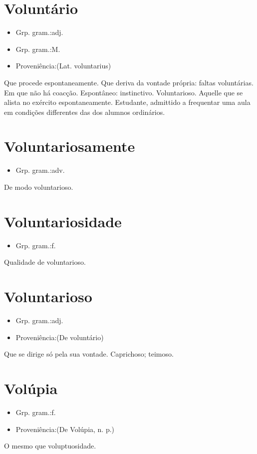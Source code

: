 \documentclass{article}
\begin{document}
\section{Voluntário}
\begin{itemize}
\item {Grp. gram.:adj.}
\end{itemize}
\begin{itemize}
\item {Grp. gram.:M.}
\end{itemize}
\begin{itemize}
\item {Proveniência:(Lat. \textunderscore voluntarius\textunderscore )}
\end{itemize}
Que procede espontaneamente.
Que deriva da vontade própria: \textunderscore faltas voluntárias\textunderscore .
Em que não há coacção.
Espontâneo: instinctivo.
Voluntarioso.
Aquelle que se alista no exército espontaneamente.
Estudante, admittido a frequentar uma aula em condições differentes das dos alumnos ordinários.
\section{Voluntariosamente}
\begin{itemize}
\item {Grp. gram.:adv.}
\end{itemize}
De modo voluntarioso.
\section{Voluntariosidade}
\begin{itemize}
\item {Grp. gram.:f.}
\end{itemize}
Qualidade de voluntarioso.
\section{Voluntarioso}
\begin{itemize}
\item {Grp. gram.:adj.}
\end{itemize}
\begin{itemize}
\item {Proveniência:(De \textunderscore voluntário\textunderscore )}
\end{itemize}
Que se dirige só pela sua vontade.
Caprichoso; teimoso.
\section{Volúpia}
\begin{itemize}
\item {Grp. gram.:f.}
\end{itemize}
\begin{itemize}
\item {Proveniência:(De \textunderscore Volúpia\textunderscore , n. p.)}
\end{itemize}
O mesmo que \textunderscore voluptuosidade\textunderscore .
\end{document}
